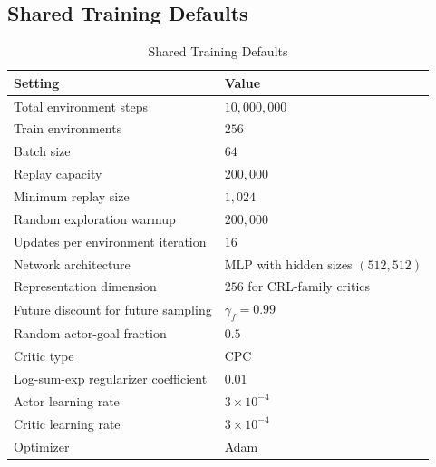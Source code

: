 \subsection{Shared Training Defaults}


\begin{table}[h]
\centering
\small
\setlength{\tabcolsep}{5pt}
\caption{Shared Training Defaults}
\label{tab:appendix-shared-training}
\begin{tabular}{ll}
\toprule
Setting & Value \\
\midrule
Total environment steps & $10{,}000{,}000$ \\
Train environments & $256$ \\
Batch size & $64$ \\
Replay capacity & $200{,}000$ \\
Minimum replay size & $1{,}024$ \\
Random exploration warmup & $200{,}000$ \\
Updates per environment iteration & $16$ \\
Network architecture & MLP with hidden sizes $(512,512)$ \\
Representation dimension & $256$ for CRL-family critics \\
Future discount for future sampling & $\gamma_f=0.99$ \\
Random actor-goal fraction & $0.5$ \\
Critic type & CPC \\
Log-sum-exp regularizer coefficient & $0.01$ \\
Actor learning rate & $3\times 10^{-4}$ \\
Critic learning rate & $3\times 10^{-4}$ \\
Optimizer & Adam \\
\bottomrule
\end{tabular}
\end{table}

